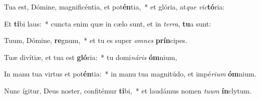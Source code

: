 \item Tua est, Dómine, magnificéntia, et pot\textbf{én}tia,~* et glória, at\textit{que} \textit{vic}\textbf{tó}ria:
\item Et \textbf{ti}bi laus:~* cuncta enim quæ in cælo sunt, et in \textit{ter}\textit{ra}, \textbf{tu}a sunt:
\item Tuum, Dómine, \textbf{re}gnum,~* et tu es super \textit{om}\textit{nes} \textbf{prín}cipes.
\item Tuæ divítiæ, et tua est \textbf{gló}ria:~* tu domi\textit{ná}\textit{ris} \textbf{óm}nium,
\item In manu tua virtus et pot\textbf{én}tia:~* in manu tua magnitúdo, et impé\textit{ri}\textit{um} \textbf{óm}nium.
\item Nunc ígitur, Deus noster, confitémur \textbf{ti}bi,~* et laudámus nomen \textit{tu}\textit{um} \textbf{ín}clytum.
